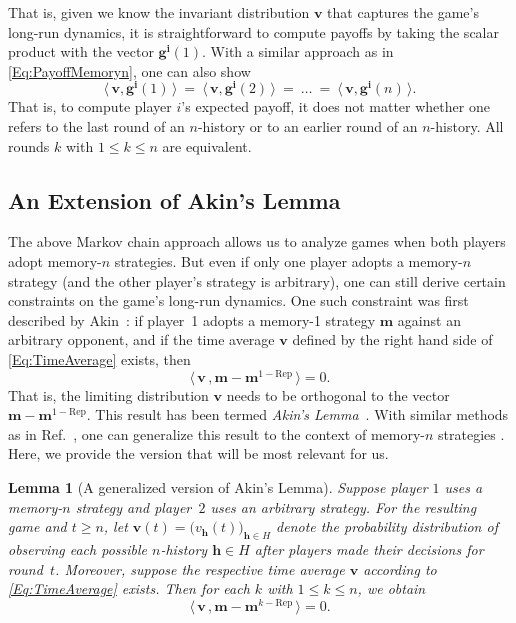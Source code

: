 \documentclass[9pt,twoside,lineno]{pnas-new}
\theoremstyle{plainCl1}
\newtheorem{lemma}{Lemma}
\theoremstyle{plainCl2}
\begin{document}
That is, given we know the invariant distribution $\mathbf{v}$ that captures the game's long-run dynamics, it is straightforward to compute payoffs by taking the scalar product with the vector $\mathbf{g^i}(1)$.
With a similar approach as in \eqref{Eq:PayoffMemoryn}, one can also show
\begin{equation} \label{Eq:EquivalencePayoff}
\big\langle\, \mathbf{v}, \mathbf{g^i}(1)\,\big\rangle  
~=~ \big\langle\, \mathbf{v}, \mathbf{g^i}(2)\,\big\rangle
~=~ \ldots
~=~ \big\langle\, \mathbf{v}, \mathbf{g^i}(n)\,\big\rangle.
\end{equation}
That is, to compute player $i$'s expected payoff, it does not matter whether one refers to the last round of an $n$-history or to an earlier round of an $n$-history. All rounds $k$ with $1\!\le\! k\! \le \! n$ are equivalent.



\subsection{An Extension of Akin's Lemma}
The above Markov chain approach allows us to analyze games when both players adopt memory-$n$ strategies. 
But even if only one player adopts a memory-$n$ strategy (and the other player's strategy is arbitrary), one can still  derive certain constraints on the game's long-run dynamics. 
One such constraint was first described by Akin~\citep{akin:EGADS:2016}: 
if player~1 adopts a memory-1 strategy $\mathbf{m}$ against an arbitrary opponent, and if the time average $\mathbf{v}$ defined by the right hand side of \eqref{Eq:TimeAverage} exists, then
\begin{equation}
\big\langle\, \mathbf{v}\, , \mathbf{m}-\mathbf{m}^{1-\text{Rep}}\,\big\rangle = 0. 
\end{equation}
That is, the limiting distribution $\mathbf{v}$ needs to be orthogonal to the vector $\mathbf{m}-\mathbf{m}^{1-\text{Rep}}$. 
This result has been termed {\it Akin's Lemma}~\citep{hilbe:PNAS:2014b}. 
With similar methods as in Ref.~\citep{akin:EGADS:2016}, one can generalize this result to the context of memory-$n$ strategies \cite{ueda:RSOP:2021}. 
Here, we provide the version that will be most relevant for us.  


\begin{lemma}[A generalized version of Akin's Lemma]\label{lemma:AkinGeneralised}
Suppose player $1$ uses a memory-$n$ strategy and player~$2$ uses an arbitrary strategy. 
For the resulting game and $t\!\ge\!n$, let $\mathbf{v}(t)\!=\!\big( v_\mathbf{h}(t) \big)_{\mathbf{h}\in H}$ denote the probability distribution of observing each possible $n$-history $\mathbf{h}\!\in\! H$ after players made their decisions for round~$t$. Moreover, suppose the respective time average $\mathbf{v}$ according to \eqref{Eq:TimeAverage} exists. Then for each $k$ with $1\!\le\!k\!\le\!n$, we obtain
\begin{equation} \label{Eq:Akin}
\big\langle\, \mathbf{v}\, , \mathbf{m}-\mathbf{m}^{k-\text{Rep}}\,\big\rangle = 0. 
\end{equation}
\end{lemma}
\end{document}
